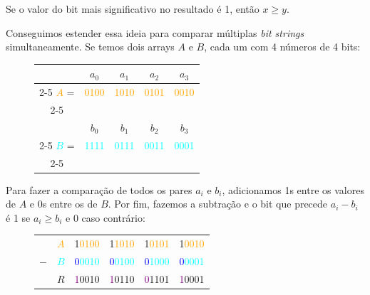 Se o valor do bit mais significativo no resultado é 1, então $x\geq y$. 

Conseguimos estender essa ideia para comparar múltiplas \textit{bit strings}
simultaneamente. Se temos dois arrays $A$ e $B$, cada um com 4 números de 4
bits:

\enlargethispage{2\baselineskip}

\begin{figure}[h]
\bf \Large \centering
\begin{tabular}{ccccc}
& $a_0$ & $a_1$ & $a_2$ & $a_3$ \\
\cline{2-5}
\textcolor{Orange}{$A$} = &
\multicolumn{1}{|c}{\textcolor{orange}{0100}} &
\textcolor{orange}{1010} &
\textcolor{orange}{0101} &
 \multicolumn{1}{c|}{\textcolor{orange}{0010}} \\
\cline{2-5} 
\hfill \\
& $b_0$ & $b_1$ & $b_2$ & $b_3$ \\
\cline{2-5}
\textcolor{cyan}{$B$} = &
\multicolumn{1}{|c}{\textcolor{cyan}{1111}} &
\textcolor{cyan}{0111} &
\textcolor{cyan}{0011} &
\multicolumn{1}{c|}{\textcolor{cyan}{0001}} \\
\cline{2-5}
\end{tabular}
\end{figure}

Para fazer a comparação de todos os pares $a_i$ e $b_i$, adicionamos 1s entre os
valores de $A$ e 0s entre os de $B$. Por fim, fazemos a subtração e o bit que
precede $a_i-b_i$ é 1 se $a_i\geq b_i$ e 0 caso contrário:

\begin{figure}[h]
\bf \Large \centering
\begin{tabular}{cccccc}
& \textcolor{Orange}{$A$} &
\textcolor{RawSienna}{1}\textcolor{orange}{0100} & \textcolor{RawSienna}{1}\textcolor{orange}{1010} & \textcolor{RawSienna}{1}\textcolor{orange}{0101} & \textcolor{RawSienna}{1}\textcolor{orange}{0010} \\
$-$ & \textcolor{cyan}{$B$} &
\textcolor{blue}{0}\textcolor{cyan}{0010} &
\textcolor{blue}{0}\textcolor{cyan}{0100} &
\textcolor{blue}{0}\textcolor{cyan}{1000} &
\textcolor{blue}{0}\textcolor{cyan}{0001} \\
\hline
& \textcolor{CarnationPink}{$R$} &
\textcolor{Purple}{1}\textcolor{CarnationPink}{0010} &
\textcolor{Purple}{1}\textcolor{CarnationPink}{0110} &
\textcolor{Purple}{0}\textcolor{CarnationPink}{1101} &
\textcolor{Purple}{1}\textcolor{CarnationPink}{0001} 
\end{tabular}
\end{figure}

